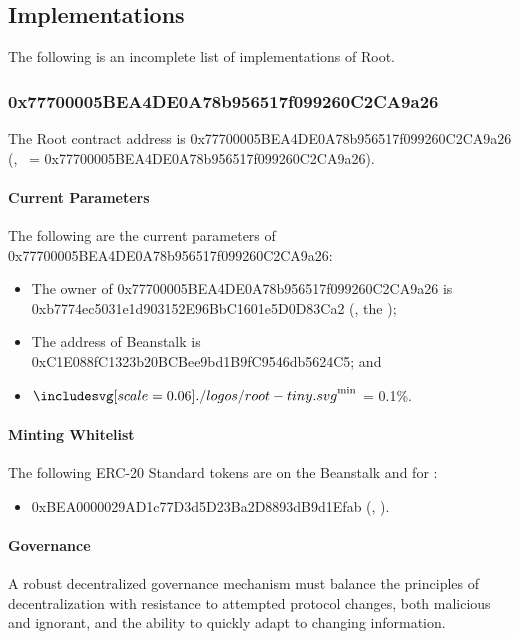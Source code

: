 \documentclass[class=article, crop=false]{standalone}
\begin{document}
\subsection{Implementations}
The following is an incomplete list of implementations of Root.

\subsubsection{0x77700005BEA4DE0A78b956517f099260C2CA9a26}
The Root contract address is 0x77700005BEA4DE0A78b956517f099260C2CA9a26 \newline(, \Root\ = 0x77700005BEA4DE0A78b956517f099260C2CA9a26).

\paragraph{Current Parameters}
The following are the current parameters of 0x77700005BEA4DE0A78b956517f099260C2CA9a26:
\begin{itemize}[itemsep=3pt,leftmargin=16pt]
    \item The owner of 0x77700005BEA4DE0A78b956517f099260C2CA9a26 is \newline0xb7774ec5031e1d903152E96BbC1601e5D0D83Ca2 (, the );
    \item The address of Beanstalk is 0xC1E088fC1323b20BCBee9bd1B9fC9546db5624C5; and
    \item $\Root^{\text{min}}$ = 0.1\%.
\end{itemize}

\paragraph{Minting Whitelist}
The following ERC-20 Standard tokens are on the Beanstalk   and  for  \Root:

\begin{itemize}[itemsep=3pt,leftmargin=16pt]
    \item 0xBEA0000029AD1c77D3d5D23Ba2D8893dB9d1Efab (, \Bean).
\end{itemize}

\paragraph{Governance}
A robust decentralized governance mechanism must balance the principles of decentralization with resistance to attempted protocol changes, both malicious and ignorant, and the ability to quickly adapt to changing information. 
\end{document}
